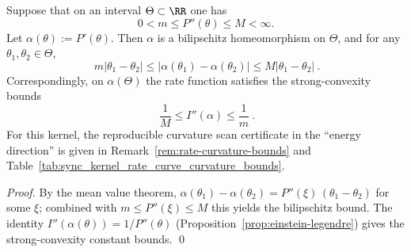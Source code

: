 \begin{proposition}[Curvature bilipschitz bounds \texorpdfstring{$\Rightarrow$}{=>} bilipschitz \texorpdfstring{$(\theta\leftrightarrow\alpha)$}{theta<->alpha} and strong-convexity constants for the rate function]\label{prop:sync-kernel-curvature-bilipschitz}
Suppose that on an interval \(\Theta\subset\RR\) one has
\[
0<m\le P''(\theta)\le M<\infty.
\]
Let \(\alpha(\theta):=P'(\theta)\). Then \(\alpha\) is a bilipschitz homeomorphism on \(\Theta\), and for any \(\theta_1,\theta_2\in\Theta\),
\[
\boxed{\ m|\theta_1-\theta_2|\le |\alpha(\theta_1)-\alpha(\theta_2)|\le M|\theta_1-\theta_2|\ }.
\]
Correspondingly, on \(\alpha(\Theta)\) the rate function satisfies the strong-convexity bounds
\[
\boxed{\ \frac{1}{M}\le I''(\alpha)\le \frac{1}{m}\ }.
\]
For this kernel, the reproducible curvature scan certificate in the ``energy direction'' is given in Remark~\ref{rem:rate-curvature-bounds} and Table~\ref{tab:sync_kernel_rate_curve_curvature_bounds}.
\end{proposition}
\begin{proof}
By the mean value theorem,
\(
\alpha(\theta_1)-\alpha(\theta_2)=P''(\xi)\,(\theta_1-\theta_2)
\)
for some \(\xi\); combined with \(m\le P''(\xi)\le M\) this yields the bilipschitz bound.
The identity \(I''(\alpha(\theta))=1/P''(\theta)\) (Proposition~\ref{prop:einstein-legendre}) gives the strong-convexity constant bounds. \qed
\end{proof}


